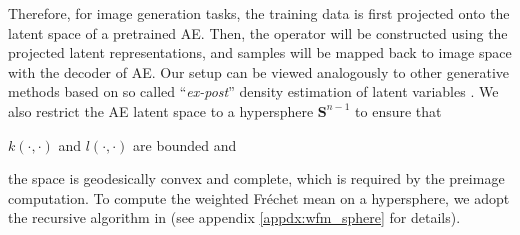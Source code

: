 Therefore, for image generation tasks, the training data is first projected onto the latent space of a pretrained AE. Then, the operator will be constructed using the projected latent representations, and samples will be mapped back to image space with the decoder of AE. Our setup can be viewed analogously to other generative methods based on so called ``\textit{ex-post}'' density estimation of latent variables \citep{Ghosh2020From}. We also restrict the AE latent space to a hypersphere $\mathbf{S}^{n- 1}$ to ensure that \begin{inparaenum}[\bfseries (a)]
\item $k(\cdot, \cdot)$ and $l(\cdot, \cdot)$ are bounded and \item the space is geodesically convex and complete, which is required by the preimage computation. To compute the weighted Fr\'{e}chet mean on a hypersphere, we adopt the recursive algorithm in \citet{chakraborty2015recursive} (see appendix \ref{appdx:wfm_sphere} for details).
\end{inparaenum}

